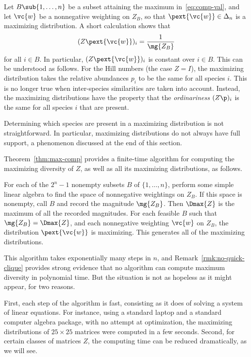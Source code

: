 \begin{remark}
Let $B \sub \{1, \ldots, n\}$ be a subset attaining the maximum
in~\eqref{eq:comp-val}, and let $\vc{w}$ be a nonnegative weighting on
$Z_B$, so that $\pext{\vc{w}} \in \Delta_n$ is a maximizing distribution.
A short calculation shows that
\[
(Z\pext{\vc{w}})_i = \frac{1}{\mg{Z_B}}
\]
for all $i \in B$.  In particular, $(Z\pext{\vc{w}})_i$ is constant over $i
\in B$.  This can be understood as follows.  For the Hill numbers (the case
$Z = I$), the maximizing distribution takes the relative
abundances $p_i$ to be the same for all species $i$.  This is no longer
true when inter-species similarities are taken into account.  Instead, the
maximizing distributions have the property that the
\emph{ordinariness} $(Z\p)_i$ is the same for all
species $i$ that are present.  

Determining which species are present%
%
%
%
%
in a maximizing distribution is
not straightforward.  In particular, maximizing distributions do not always
have full support, a phenomenon discussed at the end of this section.
\end{remark}

Theorem~\ref{thm:max-comp} provides a finite-time algorithm for computing
the maximizing diversity of $Z$, as well as all its maximizing
distributions, as follows.

For each of the $2^n - 1$ nonempty subsets $B$ of $\{1, \ldots, n\}$,
perform some simple linear algebra to find the space of nonnegative
weightings on $Z_B$.  If this space is nonempty, call $B$ 
and record the magnitude $\mg{Z_B}$.  Then $\Dmax{Z}$ is the maximum of all
the recorded magnitudes.  For each feasible $B$ such that $\mg{Z_B} =
\Dmax{Z}$, and each nonnegative weighting $\vc{w}$ on $Z_B$, the
distribution $\pext{\vc{w}}$ is maximizing.  This generates all of the
maximizing distributions.

This algorithm takes exponentially many steps in $n$, and
Remark~\ref{rmk:no-quick-clique} provides strong evidence that no algorithm
can compute maximum diversity in polynomial time.  But the situation is not
as hopeless as it might appear, for two reasons.

First, each step of the algorithm is fast, consisting as it does of solving
a system of linear equations.  For instance, using a standard laptop and a
standard computer algebra package, with no attempt at optimization, the
maximizing distributions of $25 \times 25$ matrices were computed in a few
seconds.  Second, for certain classes of matrices $Z$, the computing time
can be reduced dramatically, as we will see.

